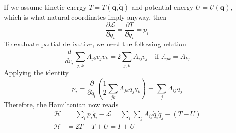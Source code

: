 \documentclass[../../../main.tex]{subfiles}
\begin{document}
If we assume kinetic energy $T=T(\mathbf{q},\dot{\mathbf{q}})$ and potential energy $U=U(\mathbf{q})$, which is what natural coordinates imply anyway, then 
\begin{equation*}
    \frac{\partial \mathcal{L}}{\partial \dot{q}_i}=\frac{\partial T}{\partial \dot{q}_i}=p_i
\end{equation*}
To evaluate partial derivative, we need the following relation
\begin{equation*}
    \frac{d}{dv_i}\sum_{j,k}A_{jk}v_jv_k=2\sum_{j,k}A_{ij}v_j\quad\text{if }A_{jk}=A_{kj}
\end{equation*}
Applying the identity 
\begin{equation*}
    p_i=\frac{\partial}{\partial \dot{q}_i}\left(\frac{1}{2}\sum_{jk}A_{jk}\dot{q}_j\dot{q}_k\right)=\sum_jA_{ij}\dot{q}_j\end{equation*}
Therefore, the Hamiltonian now reads
\begin{align*}
    \mathcal{H}&=\sum_ip_i\dot{q}_i-\mathcal{L}=\sum_i\sum_jA_{ij}\dot{q}_i\dot{q}_j-(T-U)\\
    \mathcal{H}&=2T-T+U=T+U
\end{align*}
\end{document}
